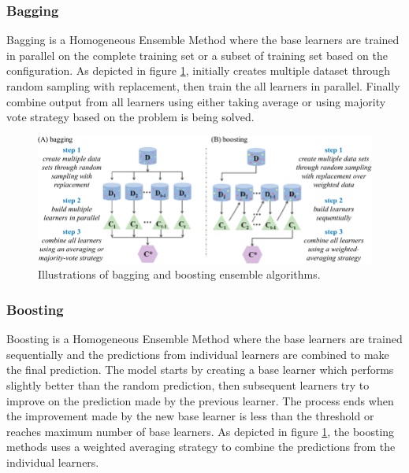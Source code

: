 \documentclass[twoside,11pt,a4paper]{article}
\begin{document}
\subsubsection{Bagging}
Bagging is a Homogeneous Ensemble Method where the base learners are trained in parallel on the complete training set or a subset of training set based on the configuration. As depicted in figure \ref{fig:bagging_boosting}, initially creates multiple dataset through random sampling with replacement, then train the all learners in parallel. Finally combine output from all learners using either taking average or using majority vote strategy based on the problem is being solved. \\
\begin{figure}[ht]
	\centering
	\includegraphics[width=1\textwidth]{bagging_boosting}
	\caption[Illustrations of bagging and boosting ensemble algorithms.]{Illustrations of bagging and boosting ensemble algorithms\citep{yang2019concepts}.}
	\label{fig:bagging_boosting}
\end{figure}
\FloatBarrier
\subsubsection{Boosting}
Boosting is a Homogeneous Ensemble Method where the base learners are trained sequentially and the predictions from individual learners are combined to make the final prediction. The model starts by creating a base learner which performs slightly better than the random prediction, then subsequent learners try to improve on the prediction made by the previous learner. The process ends when the improvement made by the new base learner is less than the threshold or reaches maximum number of base learners. As depicted in figure \ref{fig:bagging_boosting}, the boosting methods uses a weighted averaging strategy to combine the predictions from the individual learners. 
\end{document}
